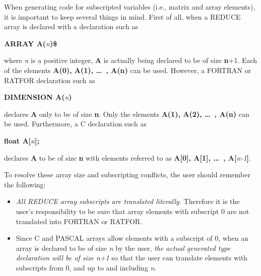 When generating code for subscripted variables (i.e., matrix and
array elements), it is important to keep several things in mind.  First
of all, when a REDUCE array is declared with a declaration such as
\begin{center}
{\bf ARRAY A(}{\it n}{\bf )\$} 
\end{center}
where {\it n} is a positive integer, {\bf A} is actually being declared
to be of size {\bf n}+1.  Each of the elements {\bf A(0), A(1), \dots\  , A(n)}
can be used.  However, a FORTRAN or RATFOR declaration such as
\begin{center}
{\bf DIMENSION A(}{\it n}{\bf )}
\end{center}
declares {\bf A} only to be of size {\bf n}.  Only the elements
{\bf A(1), A(2), \dots\  , A(n)} can be used.  Furthermore, a C declaration
such as
\begin{center}
{\bf float A[}{\it n}{\bf ];}
\end{center}
declares {\bf A} to be of size {\bf n} with elements referred to as
{\bf A[0], A[1], \dots\  , A[}{\it n-1}{\bf ]}.

To resolve these array size and subscripting conflicts, the user should
remember the following:
\begin{itemize}
\item {\it All REDUCE array subscripts are translated literally.}
Therefore it is the user's responsibility to be sure that array elements with
subscript 0 are not translated into FORTRAN or RATFOR.
\item Since C and PASCAL
arrays allow elements with a subscript of 0, when an array is
declared to be of size {\it n} by the user, {\it the actual generated type
declaration will be of size n+1} so that the user can translate
elements with subscripts from 0, and up to and including {\it n}.
\end{itemize}

